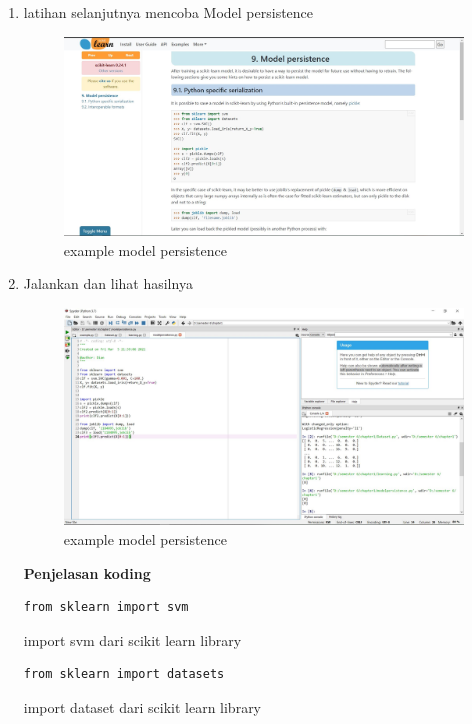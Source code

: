 \begin{enumerate}
		\item{latihan selanjutnya mencoba Model persistence}
        \begin{figure}[H]
		\centering
		\includegraphics[width=1\textwidth]{figures/1184095/chapter1/9 awal.JPG}
		\caption{example model persistence}
		\label{print}
		\end{figure}
		
		\item{Jalankan dan lihat hasilnya}
        \begin{figure}[H]
		\centering
		\includegraphics[width=1\textwidth]{figures/1184095/chapter1/9.JPG}
		\caption{example model persistence}
		\label{print}
		\end{figure}
		
		\textbf{Penjelasan koding} 
		
		\begin{verbatim}from sklearn import svm\end{verbatim}import svm dari scikit learn library
		
		\begin{verbatim}from sklearn import datasets\end{verbatim}import dataset dari scikit learn library
        

\end{enumerate}
